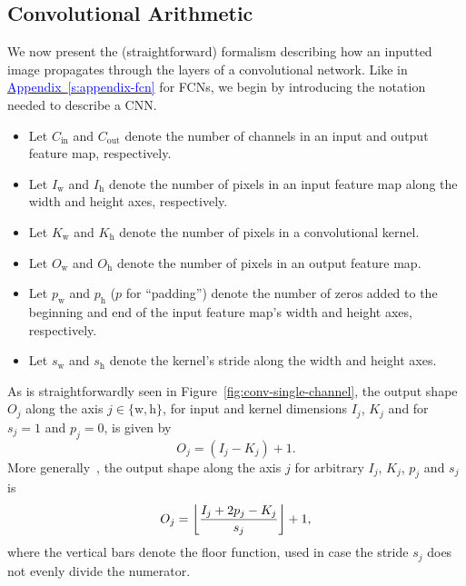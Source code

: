 \documentclass[11pt, a4paper]{article}
\newcommand{\myhref}[2]{\hyperref[#1]{\textcolor{blue}{#2}}}
\DeclarePairedDelimiter\floor{\lfloor}{\rfloor}  %
\begin{document}
\subsection{Convolutional Arithmetic} \label{ss:conv-arithmetic}
We now present the (straightforward) formalism describing how an inputted image propagates through the layers of a convolutional network.
Like in \myhref{s:appendix-fcn}{Appendix~\ref{s:appendix-fcn}} for FCNs, we begin by introducing the notation needed to describe a CNN.
\begin{itemize}

    \item Let $ C_{\text{in}} $ and $ C_{\text{out}} $ denote the number of channels in an input and output feature map, respectively.

    \item Let $ I_{\text{w}} $ and $ I_{\text{h}} $ denote the number of pixels in an input feature map along the width and height axes, respectively.

    \item Let $ K_{\text{w}} $ and $ K_{\text{h}} $ denote the number of pixels in a convolutional kernel. %

    \item Let $ O_{\text{w}} $ and $ O_{\text{h}} $ denote the number of pixels in an output feature map. %

    \item Let $ p_{\text{w}} $ and $ p_{\text{h}} $ ($ p $ for ``padding'') denote the number of zeros added to the beginning and end of the input feature map's width and height axes, respectively.

    \item Let $ s_{\text{w}} $ and $ s_{\text{h}} $ denote the kernel's stride along the width and height axes.

\end{itemize}
As is straightforwardly seen in Figure~\ref{fig:conv-single-channel}, the output shape $ O_{j} $ along the axis $ j \in \{\text{w}, \text{h}\} $, for input and kernel dimensions $ I_{j} $, $ K_{j} $ and for $ s_{j} = 1 $ and $ p_{j} = 0 $, is given by
\begin{equation*}
    O_{j} = (I_{j} - K_{j}) + 1.
\end{equation*}
More generally~\cite{cnn-guide}, the output shape along the axis $ j $ for arbitrary $ I_{j} $, $ K_{j} $, $ p_{j} $ and $ s_{j} $ is
\begin{equation}
    O_{j} = \floor*{\frac{I_{j} + 2p_{j} - K_{j}}{s_{j}}} + 1, \label{eq:cnn-O-conv}
\end{equation}
where the vertical bars denote the floor function, used in case the stride $ s_{j} $ does not evenly divide the numerator.
\end{document}
